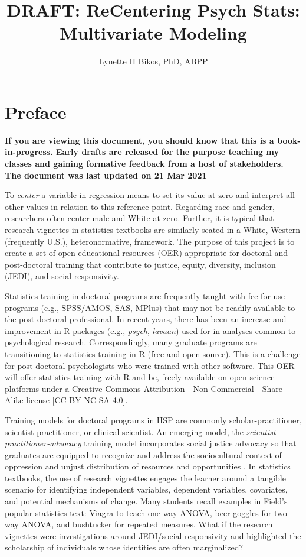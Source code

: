 \documentclass[
  english,
]{book}
\title{DRAFT: ReCentering Psych Stats: Multivariate Modeling}
\author{Lynette H Bikos, PhD, ABPP}
\date{}
\begin{document}
\maketitle

{
\setcounter{tocdepth}{1}
\tableofcontents
}
\hypertarget{preface}{%
\chapter*{Preface}\label{preface}}

\textbf{If you are viewing this document, you should know that this is a book-in-progress. Early drafts are released for the purpose teaching my classes and gaining formative feedback from a host of stakeholders. The document was last updated on 21 Mar 2021}

To \emph{center} a variable in regression means to set its value at zero and interpret all other values in relation to this reference point. Regarding race and gender, researchers often center male and White at zero. Further, it is typical that research vignettes in statistics textbooks are similarly seated in a White, Western (frequently U.S.), heteronormative, framework. The purpose of this project is to create a set of open educational resources (OER) appropriate for doctoral and post-doctoral training that contribute to justice, equity, diversity, inclusion (JEDI), and social responsivity.

Statistics training in doctoral programs are frequently taught with fee-for-use programs (e.g., SPSS/AMOS, SAS, MPlus) that may not be readily available to the post-doctoral professional. In recent years, there has been an increase and improvement in R packages (e.g., \emph{psych}, \emph{lavaan}) used for in analyses common to psychological research. Correspondingly, many graduate programs are transitioning to statistics training in R (free and open source). This is a challenge for post-doctoral psychologists who were trained with other software. This OER will offer statistics training with R and be, freely available on open science platforms under a Creative Commons Attribution - Non Commercial - Share Alike license {[}CC BY-NC-SA 4.0{]}.

Training models for doctoral programs in HSP are commonly scholar-practitioner, scientist-practitioner, or clinical-scientist. An emerging model, the \emph{scientist-practitioner-advocacy} training model incorporates social justice advocacy so that graduates are equipped to recognize and address the sociocultural context of oppression and unjust distribution of resources and opportunities \citep{mallinckrodt_scientist-practitioner-advocate_2014}. In statistics textbooks, the use of research vignettes engages the learner around a tangible scenario for identifying independent variables, dependent variables, covariates, and potential mechanisms of change. Many students recall examples in Field's \citeyearpar{field_discovering_2012} popular statistics text: Viagra to teach one-way ANOVA, beer goggles for two-way ANOVA, and bushtucker for repeated measures. What if the research vignettes were investigations around JEDI/social responsivity and highlighted the scholarship of individuals whose identities are often marginalized?
\end{document}
